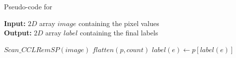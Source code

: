 \begin{algorithm}[ht!]
\small
{
	\caption{Pseudo-code for \nremsp}
	\label{alg:RemSP}
	\textbf{Input:} $2D$ array $image$ containing the pixel values \\
	\textbf{Output:} $2D$ array $label$ containing the final labels
	\begin{algorithmic}[1]
		\State $Scan\_CCLRemSP(image)$ 
		\State $flatten(p,count)$ 
		  
				\State $label(e) \gets p[label(e)]$
			\EndFor
		\EndFor
	\EndFunction
	\end{algorithmic}
}	
\end{algorithm}

